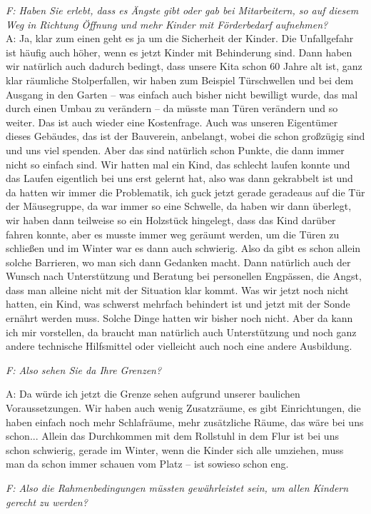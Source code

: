 \begin{linenumbers*}
\emph{F: Haben Sie erlebt, dass es Ängste gibt oder gab bei Mitarbeitern, so auf diesem Weg in Richtung Öffnung und mehr Kinder mit Förderbedarf aufnehmen?}\\
A: Ja, klar zum einen geht es ja um die Sicherheit der Kinder. Die Unfallgefahr ist häufig auch höher, wenn es jetzt Kinder mit Behinderung sind. Dann haben wir natürlich auch dadurch bedingt, dass unsere Kita schon 60 Jahre alt ist, ganz klar räumliche Stolperfallen, wir haben zum Beispiel Türschwellen und bei dem Ausgang in den Garten -- was einfach auch bisher nicht bewilligt wurde, das mal durch einen Umbau zu verändern -- da müsste man Türen verändern und so weiter. Das ist auch wieder eine Kostenfrage. Auch was unseren Eigentümer dieses Gebäudes, das ist der Bauverein, anbelangt, wobei die schon großzügig sind und uns viel spenden. Aber das sind natürlich schon Punkte, die dann immer nicht so einfach sind. Wir hatten mal ein Kind, das schlecht laufen konnte und das Laufen eigentlich bei uns erst gelernt hat, also was dann gekrabbelt ist und da hatten wir immer die Problematik, ich guck jetzt gerade geradeaus auf die Tür der Mäusegruppe, da war immer so eine Schwelle, da haben wir dann überlegt, wir haben dann teilweise so ein Holzstück hingelegt, dass das Kind darüber fahren konnte, aber es musste immer weg geräumt werden, um die Türen zu schließen und im Winter war es dann auch schwierig. Also da gibt es schon allein solche Barrieren, wo man sich dann Gedanken macht. Dann natürlich auch der Wunsch nach Unterstützung und Beratung bei personellen Engpässen, die Angst, dass man alleine nicht mit der Situation klar kommt. Was wir jetzt noch nicht hatten, ein Kind, was schwerst mehrfach behindert ist und jetzt mit der Sonde ernährt werden muss. Solche Dinge hatten wir bisher noch nicht. Aber da kann ich mir vorstellen, da braucht man natürlich auch Unterstützung und noch ganz andere technische Hilfsmittel oder vielleicht auch noch eine andere Ausbildung. 

\emph{F: Also sehen Sie da Ihre Grenzen?}

A: Da würde ich jetzt die Grenze sehen aufgrund unserer baulichen Voraussetzungen. Wir haben auch wenig Zusatzräume, es gibt Einrichtungen, die haben einfach noch mehr Schlafräume, mehr zusätzliche Räume, das wäre bei uns schon... Allein das Durchkommen mit dem Rollstuhl in dem Flur ist bei uns schon schwierig, gerade im Winter, wenn die Kinder sich alle umziehen, muss man da schon immer schauen vom Platz -- ist sowieso schon eng. 

\emph{F: Also die Rahmenbedingungen müssten gewährleistet sein, um allen Kindern gerecht zu werden?}


\end{linenumbers*}
